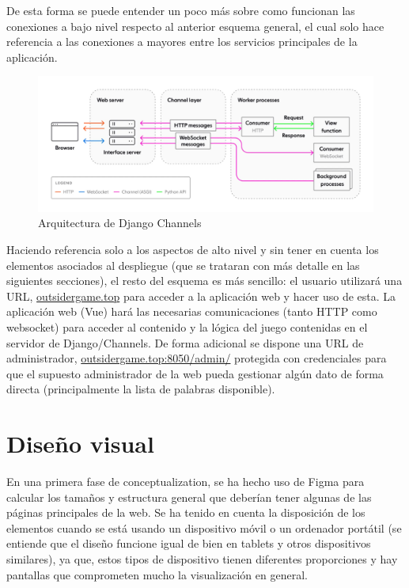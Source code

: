 De esta forma se puede entender un poco más sobre como funcionan las 
conexiones a bajo nivel respecto al anterior esquema general, el cual solo hace referencia a las conexiones 
a mayores entre los servicios principales de la aplicación.

\begin{figure}[h]
	\centering
	\includegraphics[width=\textwidth,clip=true]{res_esquemaDjangoChannels.jpg}
	\caption{Arquitectura de Django Channels}
	\label{fig:res_esquemaDjangoChannels}
\end{figure}

Haciendo referencia solo a los aspectos de alto nivel y sin tener en cuenta los elementos asociados al despliegue (que se trataran con más detalle en las siguientes secciones), 
el resto del esquema es más sencillo: el usuario utilizará una URL, \href{http://outsidergame.top/}{outsidergame.top}  para acceder a la aplicación web y hacer uso de esta. La aplicación web (Vue) hará las necesarias comunicaciones (tanto HTTP como websocket) 
para acceder al contenido y la lógica del juego contenidas en el servidor de Django/Channels. De forma adicional se dispone una URL de administrador, 
\href{http://outsidergame.top:8050/admin/}{outsidergame.top:8050/admin/} protegida con credenciales para que el supuesto administrador de la web 
pueda gestionar algún dato de forma directa (principalmente la lista de palabras disponible).

\section{Diseño visual}

En una primera fase de conceptualization, se ha hecho uso de Figma \cite{figma} para calcular los tamaños y 
estructura general que deberían tener algunas de las páginas principales de la web. Se ha tenido en cuenta la disposición de los elementos cuando 
se está usando un dispositivo móvil o un ordenador portátil (se entiende que el diseño funcione igual de bien en tablets y otros dispositivos similares), ya que, 
estos tipos de dispositivo tienen diferentes proporciones y hay pantallas que comprometen mucho la visualización en general.

